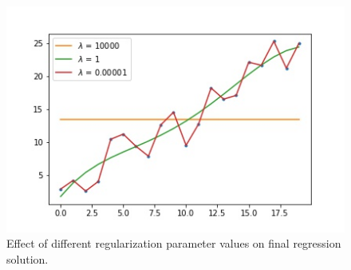 \begin{figure}
    \centering
    \includegraphics[width=0.5\paperwidth]{../LinearRegression/fig/diffregvalues_GEN.jpg}
    \caption{Effect of different regularization parameter values on final regression solution.}
    \label{fig:ridge-reg-diff-values}
\end{figure}

